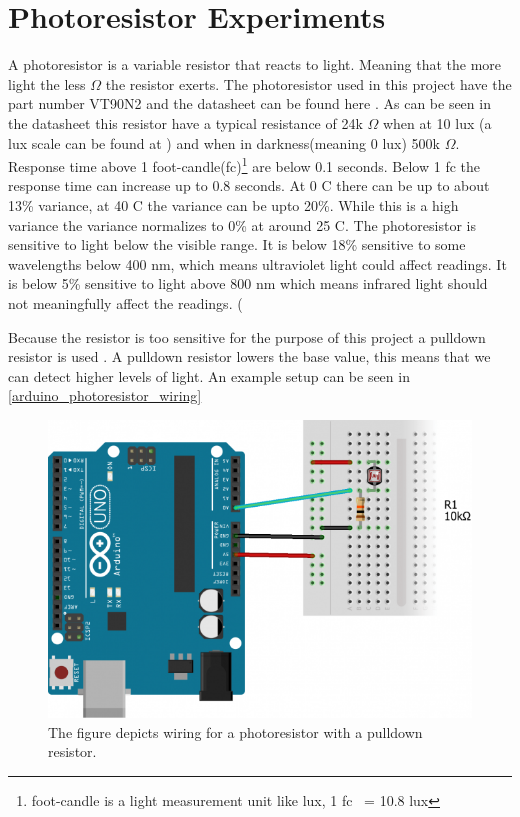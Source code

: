 \section{Photoresistor Experiments}
A photoresistor is a variable resistor that reacts to light. Meaning that the more light the less $\Omega$ the resistor exerts. The photoresistor used in this project have the part number VT90N2 and the datasheet can be found here \cite{photoresistor_sheet}. As can be seen in the datasheet this resistor have a typical resistance of 24k $\Omega$ when at 10 lux (a lux scale can be found at \cite{lux_scale}) and when in darkness(meaning 0 lux) 500k $\Omega$. Response time above 1 foot-candle(fc)\footnote{foot-candle is a light measurement unit like lux, 1 fc ~= 10.8 lux} are below 0.1 seconds. Below 1 fc the response time can increase up to 0.8 seconds. At 0 \degree C there can be up to about 13\% variance, at 40 \degree C the variance can be upto 20\%. While this is a high variance the variance normalizes to 0\% at around 25 \degree C. The photoresistor is sensitive to light below the visible range. It is below 18\% sensitive to some wavelengths below 400 nm, which means ultraviolet light could affect readings. It is below 5\% sensitive to light above 800 nm which means infrared light should not meaningfully affect the readings. (

Because the resistor is too sensitive for the purpose of this project a pulldown resistor is used \cite{pulldown_resistor}. A pulldown resistor lowers the base value, this means that we can detect higher levels of light. An example setup can be seen in \cref{arduino_photoresistor_wiring}
\begin{figure}[htbp]
  \centering
  \includegraphics[width=\textwidth]{Design/PhotoSensorTests/Images/photoresistor_setup.png}
  \caption{The figure depicts wiring for a photoresistor with a pulldown resistor.}
  \label{fig:arduino_photoresistor_wiring}
\end{figure}


